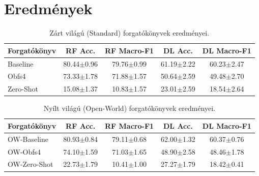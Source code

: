 \documentclass[a4paper,12pt]{article}
\begin{document}
\section{Eredmények}
\begin{table}[hbt!]
    \caption{Zárt világú (Standard) forgatókönyvek eredményei.}
    \vspace{2mm}
    \centering
    \begin{tabular}{lcccc}
        \toprule
        \textbf{Forgatókönyv} & \textbf{RF Acc.} & \textbf{RF Macro-F1} & \textbf{DL Acc.} & \textbf{DL Macro-F1} \\ \midrule
        Baseline & 80.44$\pm$0.96 & 79.76$\pm$0.99 & 61.19$\pm$2.22 & 60.23$\pm$2.47 \\
        Obfs4 & 73.33$\pm$1.78 & 71.88$\pm$1.57 & 50.64$\pm$2.59 & 49.48$\pm$2.70 \\
        Zero-Shot & 15.08$\pm$1.37 & 10.83$\pm$1.57 & 23.01$\pm$2.59 & 18.54$\pm$2.64 \\
        \bottomrule
    \end{tabular}
\end{table}

\begin{table}[hbt!]
    \caption{Nyílt világú (Open-World) forgatókönyvek eredményei.}
    \vspace{2mm}
    \centering
    \begin{tabular}{lcccc}
        \toprule
        \textbf{Forgatókönyv} & \textbf{RF Acc.} & \textbf{RF Macro-F1} & \textbf{DL Acc.} & \textbf{DL Macro-F1} \\ \midrule
        OW-Baseline & 80.93$\pm$0.84 & 79.11$\pm$0.68 & 62.00$\pm$1.32 & 60.37$\pm$0.76 \\
        OW-Obfs4 & 74.10$\pm$1.59 & 71.03$\pm$1.65 & 48.90$\pm$2.58 & 48.46$\pm$1.78 \\
        OW-Zero-Shot & 22.73$\pm$1.79 & 10.41$\pm$1.00 & 27.27$\pm$1.79 & 18.42$\pm$0.41 \\
        \bottomrule
    \end{tabular}
\end{table}
\end{document}
